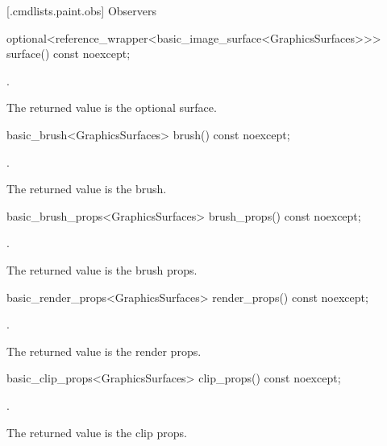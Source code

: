  [\iotwod.cmdlists.paint.obs] {Observers}%

%
\begin{itemdecl}
optional<reference_wrapper<basic_image_surface<GraphicsSurfaces>>> 
  surface() const noexcept;
\end{itemdecl}
\begin{itemdescr}
\pnum
\returns {}.

\pnum
\remarks
The returned value is the optional surface.
\end{itemdescr}

%
\begin{itemdecl}
basic_brush<GraphicsSurfaces> brush() const noexcept;
\end{itemdecl}
\begin{itemdescr}
\pnum
\returns {}.

\pnum
\remarks The returned value is the brush.
\end{itemdescr}

%
\begin{itemdecl}
basic_brush_props<GraphicsSurfaces> brush_props() const noexcept;
\end{itemdecl}
\begin{itemdescr}
\pnum
\returns {}.

\pnum
\remarks The returned value is the brush props.
\end{itemdescr}

%
\begin{itemdecl}
basic_render_props<GraphicsSurfaces> render_props() const noexcept;
\end{itemdecl}
\begin{itemdescr}
\pnum
\returns {}.

\pnum
\remarks The returned value is the render props.
\end{itemdescr}

%
\begin{itemdecl}
basic_clip_props<GraphicsSurfaces> clip_props() const noexcept;
\end{itemdecl}
\begin{itemdescr}
\pnum
\returns {}.

\pnum
\remarks The returned value is the clip props.
\end{itemdescr}

